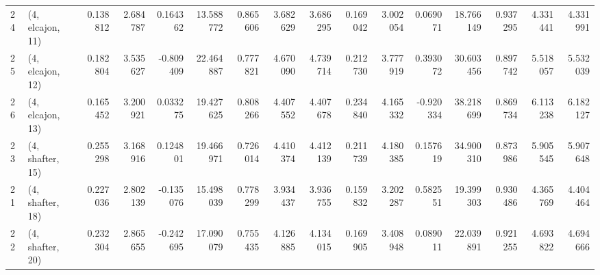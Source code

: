 \begin{tabular}{llrrrrrrrrrrrrrr}
24 &  (4, elcajon, 11) &   0.138812 &  2.684787 &  0.164362 &  13.588772 &  0.865606 &   3.682629 &  3.686295 &  0.169042 &  3.002054 &  0.069071 &   18.766149 &  0.937295 &   4.331441 &   4.331991 \\
25 &  (4, elcajon, 12) &   0.182804 &  3.535627 & -0.809409 &  22.464887 &  0.777821 &   4.670090 &  4.739714 &  0.212730 &  3.777919 &  0.393072 &   30.603456 &  0.897742 &   5.518057 &   5.532039 \\
26 &  (4, elcajon, 13) &   0.165452 &  3.200921 &  0.033275 &  19.427625 &  0.808266 &   4.407552 &  4.407678 &  0.234840 &  4.165332 & -0.920334 &   38.218699 &  0.869734 &   6.113238 &   6.182127 \\
23 &  (4, shafter, 15) &   0.255298 &  3.168916 &  0.124801 &  19.466971 &  0.726014 &   4.410374 &  4.412139 &  0.211739 &  4.180385 &  0.157619 &   34.900310 &  0.873986 &   5.905545 &   5.907648 \\
21 &  (4, shafter, 18) &   0.227036 &  2.802139 & -0.135076 &  15.498039 &  0.778299 &   3.934437 &  3.936755 &  0.159832 &  3.202287 &  0.582551 &   19.399303 &  0.930486 &   4.365769 &   4.404464 \\
22 &  (4, shafter, 20) &   0.232304 &  2.865655 & -0.242695 &  17.090079 &  0.755435 &   4.126885 &  4.134015 &  0.169905 &  3.408948 &  0.089011 &   22.039891 &  0.921255 &   4.693822 &   4.694666 \\
\bottomrule
\end{tabular}
